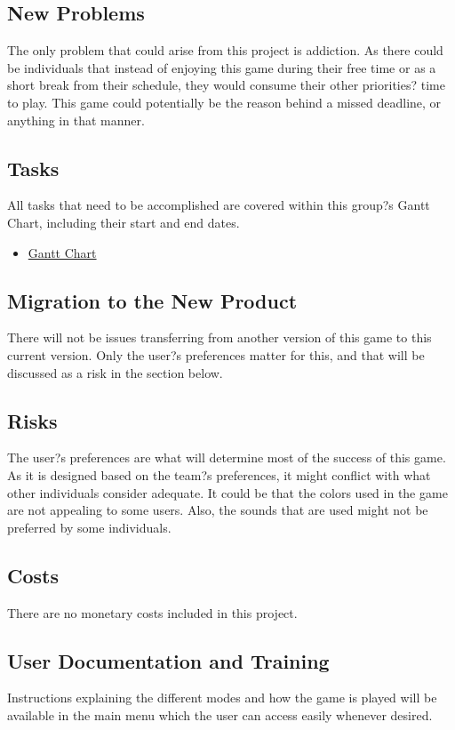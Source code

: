 \documentclass[12pt, titlepage]{article}
\begin{document}
\subsection{New Problems}
The only problem that could arise from this project is addiction. As there could be individuals that instead of enjoying this game during their free time or as a short break from their schedule, they would consume their other priorities? time to play. This game could potentially be the reason behind a missed deadline, or anything in that manner.

\subsection{Tasks}
All tasks that need to be accomplished are covered within this group?s Gantt Chart, including their start and end dates.

\begin{itemize}
\item \href{run:GanttChart.gan} {Gantt Chart}\\
\end{itemize}

\subsection{Migration to the New Product}
There will not be issues transferring from another version of this game to this current version. Only the user?s preferences matter for this, and that will be discussed as a risk in the section below.

\subsection{Risks}
The user?s preferences are what will determine most of the success of this game. As it is designed based on the team?s preferences, it might conflict with what other individuals consider adequate. It could be that the colors used in the game are not appealing to some users. Also, the sounds that are used might not be preferred by some individuals.

\subsection{Costs}
There are no monetary costs included in this project.

\subsection{User Documentation and Training}
Instructions explaining the different modes and how the game is played will be available in the main menu which the user can access easily whenever desired.
\end{document}
